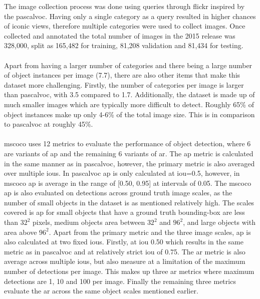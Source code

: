 The image collection process was done using queries through flickr inspired by the \gls{pascalvoc}. Having only a single category as a query resulted in higher chances of iconic views, therefore multiple categories were used to collect images. Once collected and annotated the total number of images in the 2015 release was 328,000, split as 165,482 for training, 81,208 validation and 81,434 for testing.
\\\\
Apart from having a larger number of categories and there being a large number of object instances per image (7.7), there are also other items that make this dataset more challenging. Firstly, the number of categories per image is larger than \gls{pascalvoc}, with 3.5 compared to 1.7. Additionally, the dataset is made up of much smaller images which are typically more difficult to detect. Roughly 65\% of object instances make up only 4-6\% of the total image size. This is in comparison to \gls{pascalvoc} at roughly 45\%.
\\\\
\gls{mscoco} uses 12 metrics to evaluate the performance of object detection, where 6 are variants of \gls{ap} and the remaining 6 variants of \gls{ar}. The \gls{ap} metric is calculated in the same manner as in \gls{pascalvoc}, however, the primary metric is also averaged over multiple \glspl{iou}. In \gls{pascalvoc} \gls{ap} is only calculated at \gls{iou}=0.5, however, in \gls{mscoco} \gls{ap} is average in the range of [0.50, 0.95] at intervals of 0.05. The \gls{mscoco} \gls{ap} is also evaluated on detections across ground truth image scales, as the number of small objects in the dataset is as mentioned relatively high. The scales covered is \gls{ap} for small objects that have a ground truth bounding-box are less than $32^2$ pixels, medium objects area between $32^2$ and $96^2$, and large objects with area above $96^2$. Apart from the primary metric and the three image scales, \gls{ap} is also calculated at two fixed \glspl{iou}. Firstly, at \gls{iou} 0.50 which results in the same metric as in \gls{pascalvoc} and at relatively strict \gls{iou} of 0.75. The \gls{ar} metric is also average across multiple \glspl{iou}, but also measure at a limitation of the maximum number of detections per image. This makes up three \gls{ar} metrics where maximum detections are 1, 10 and 100 per image. Finally the remaining three metrics evaluate the \gls{ar} across the same object scales mentioned earlier.